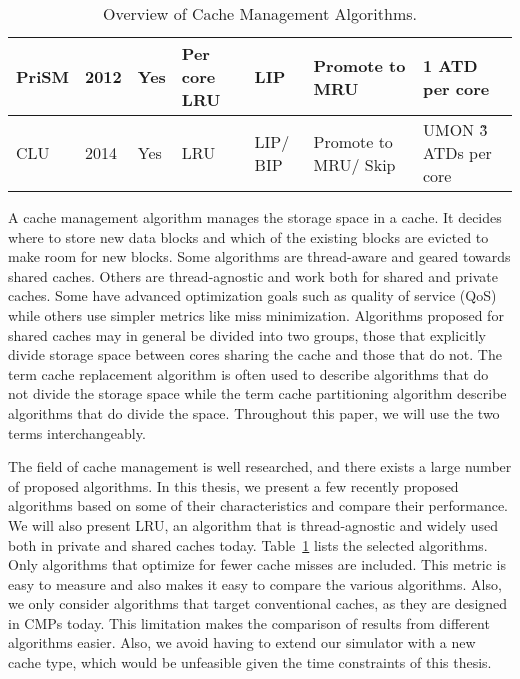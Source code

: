 \begin{table}[htb]
\begin{tabular}{|p{1.0cm}|p{0.5cm}|p{0.8cm}|p{1.2cm}|p{1.2cm}|p{1.2cm}|p{1.2cm}|}
PriSM                           & 2012                           & Yes                         & Per core LRU                  & LIP                            & Promote to MRU                 & 1 ATD per core                        \\ \hline
CLU                             & 2014                           & Yes                         & LRU                              & LIP/ BIP                        & Promote to MRU/ Skip            & UMON \~3 ATDs per core                 \\ \hline
\end{tabular}
\caption{Overview of Cache Management Algorithms.}
\label{tbl:algorithms}
\end{table}

A cache management algorithm manages the storage space in a cache.
It decides where to store new data blocks and which of the existing blocks are evicted to make room for new blocks.
Some algorithms are thread-aware and geared towards shared caches.
Others are thread-agnostic and work both for shared and private caches.
Some have advanced optimization goals such as quality of service (QoS) while others use simpler metrics like miss minimization.
Algorithms proposed for shared caches may in general be divided into two groups, those that explicitly divide storage space between cores sharing the cache and those that do not.
The term cache replacement algorithm is often used to describe algorithms that do not divide the storage space while the term cache partitioning algorithm describe algorithms that do divide the space.
Throughout this paper, we will use the two terms interchangeably.


The field of cache management is well researched, and there exists a large number of proposed algorithms.
In this thesis, we present a few recently proposed algorithms based on some of their characteristics and compare their performance.
We will also present LRU, an algorithm that is thread-agnostic and widely used both in private and shared caches today.
Table~\ref{tbl:algorithms} lists the selected algorithms.
Only algorithms that optimize for fewer cache misses are included.
This metric is easy to measure and also makes it easy to compare the various algorithms.
Also, we only consider algorithms that target conventional caches, as they are designed in CMPs today.
This limitation makes the comparison of results from different algorithms easier.
Also, we avoid having to extend our simulator with a new cache type, which would be unfeasible given the time constraints of this thesis.

